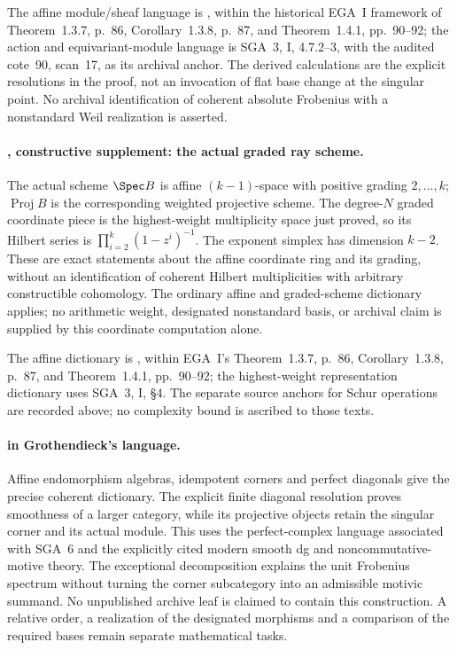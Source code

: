 The affine module/sheaf language is
\cite[Lemma~26.7.5, tag~01IB]{StacksAffine}, within the
historical EGA~I framework of Theorem~1.3.7, p.~86,
Corollary~1.3.8, p.~87, and Theorem~1.4.1, pp.~90--92; the action and
equivariant-module language is SGA~3, I, 4.7.2--3, with the audited
cote~90, scan~17, as its archival anchor. The derived calculations
are the explicit resolutions in the proof, not an invocation of
flat base change at the singular point. No archival identification
of coherent absolute Frobenius with a nonstandard Weil realization
is asserted.


\paragraph{, constructive supplement: the actual graded ray scheme.}
The actual scheme $\Spec B$ is affine $(k-1)$-space with positive
grading $2,\ldots,k$; $\operatorname{Proj}B$ is the corresponding
weighted projective scheme. The degree-$N$ graded coordinate piece
is the highest-weight multiplicity space just proved, so its Hilbert
series is $\prod_{i=2}^k(1-z^i)^{-1}$. The exponent simplex has
dimension $k-2$. These are exact statements about the affine
coordinate ring and its grading, without an identification of
coherent Hilbert multiplicities with arbitrary constructible
cohomology. The ordinary affine and graded-scheme dictionary applies;
no arithmetic weight, designated nonstandard basis, or archival
claim is supplied by this coordinate computation alone.

The affine dictionary is \cite[Lemma~26.7.5, tag~01IB]{StacksAffine},
within EGA~I's Theorem~1.3.7, p.~86, Corollary~1.3.8,
p.~87, and Theorem~1.4.1, pp.~90--92; the highest-weight
representation dictionary uses SGA~3, I, \S4. The separate source anchors for Schur operations are recorded above; no complexity bound is ascribed to those texts.


\paragraph{ in Grothendieck's language.}
Affine endomorphism algebras, idempotent corners and perfect
diagonals give the precise coherent dictionary. The explicit
finite diagonal resolution proves smoothness of a larger category,
while its projective objects retain the singular corner and its
actual module. This uses the perfect-complex language associated
with SGA~6 and the explicitly cited modern smooth dg and
noncommutative-motive theory. The exceptional decomposition
explains the unit Frobenius spectrum without turning the corner
subcategory into an admissible motivic summand. No unpublished
archive leaf is claimed to contain this construction. A relative
order, a realization of the designated morphisms and a comparison
of the required bases remain separate mathematical tasks.

